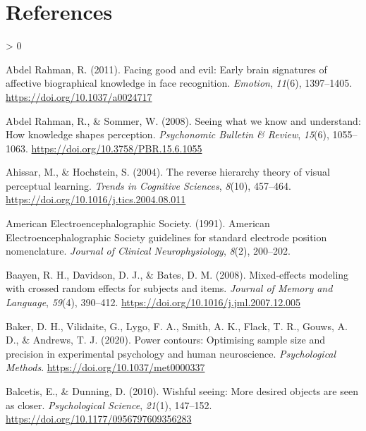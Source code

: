\documentclass[
  english,
  man,floatsintext]{apa7}
\newlength{\cslhangindent}
\newenvironment{CSLReferences}[2] %
 {%
  \setlength{\parindent}{0pt}
  \ifodd #1 \everypar{\setlength{\hangindent}{\cslhangindent}}\ignorespaces\fi
  \ifnum #2 > 0
  \setlength{\parskip}{#2\baselineskip}
  \fi
 }%
 {}
\begin{document}
\newpage

\hypertarget{references}{%
\section{References}\label{references}}

\setlength{\parindent}{-0.5in}

\hypertarget{refs}{}
\begin{CSLReferences}{1}{0}
\leavevmode\hypertarget{ref-abdelrahman2011}{}%
Abdel Rahman, R. (2011). Facing good and evil: Early brain signatures of affective biographical knowledge in face recognition. \emph{Emotion}, \emph{11}(6), 1397--1405. \url{https://doi.org/10.1037/a0024717}

\leavevmode\hypertarget{ref-abdelrahman2008}{}%
Abdel Rahman, R., \& Sommer, W. (2008). Seeing what we know and understand: How knowledge shapes perception. \emph{Psychonomic Bulletin \& Review}, \emph{15}(6), 1055--1063. \url{https://doi.org/10.3758/PBR.15.6.1055}

\leavevmode\hypertarget{ref-ahissar2004}{}%
Ahissar, M., \& Hochstein, S. (2004). The reverse hierarchy theory of visual perceptual learning. \emph{Trends in Cognitive Sciences}, \emph{8}(10), 457--464. \url{https://doi.org/10.1016/j.tics.2004.08.011}

\leavevmode\hypertarget{ref-americanelectroencephalographicsociety1991}{}%
American Electroencephalographic Society. (1991). {American Electroencephalographic Society} guidelines for standard electrode position nomenclature. \emph{Journal of Clinical Neurophysiology}, \emph{8}(2), 200--202.

\leavevmode\hypertarget{ref-baayen2008}{}%
Baayen, R. H., Davidson, D. J., \& Bates, D. M. (2008). Mixed-effects modeling with crossed random effects for subjects and items. \emph{Journal of Memory and Language}, \emph{59}(4), 390--412. \url{https://doi.org/10.1016/j.jml.2007.12.005}

\leavevmode\hypertarget{ref-baker2020}{}%
Baker, D. H., Vilidaite, G., Lygo, F. A., Smith, A. K., Flack, T. R., Gouws, A. D., \& Andrews, T. J. (2020). Power contours: Optimising sample size and precision in experimental psychology and human neuroscience. \emph{Psychological Methods}. \url{https://doi.org/10.1037/met0000337}

\leavevmode\hypertarget{ref-balcetis2010}{}%
Balcetis, E., \& Dunning, D. (2010). Wishful seeing: More desired objects are seen as closer. \emph{Psychological Science}, \emph{21}(1), 147--152. \url{https://doi.org/10.1177/0956797609356283}


\end{CSLReferences}
\end{document}
